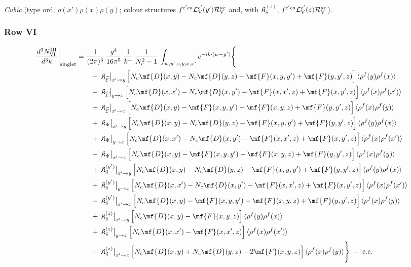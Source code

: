\emph{Cubic} (type ord, $\rho(x')\rho(x)\rho(y)$; colour structures $f^{c'ca}\mathcal{L}^{c'}_{\rm V}(y')\mathcal{R}^{ac}_{\rm V}$ and, with $\mathfrak{K}_{\delta}^{(z)}$, $f^{c'ca}\mathcal{L}^{c'}_{\rm V}(z)\mathcal{R}^{ac}_{\rm V}$).
\subsubsection*{Row VI}

\begin{align}
\frac{d^{3}N^{\rm III}_{\rm VI}}{d^{3}k}\bigg|_{\rm singlet}&=\frac{1}{(2\pi)^{3}}\,\frac{g^{4}}{16\pi^{5}}\,\frac{1}{k^{+}}\,\frac{1}{N_{c}^{2}-1}\,\int_{w,y',z,y,x,x'}e^{-ik\cdot(w-y')}\Bigg\{\notag\\
&\qquad -\,\mathfrak{K}_{\widehat{\mathcal{E}}}\big|_{x'\to y}\,\Big[N_{c}\mf{D}(x,y)-N_{c}\mf{D}(y,z)-\mf{F}(x,y,y')+\mf{F}(y,y',z)\Big]\,\langle\rho^{f}(y)\rho^{f}(x)\rangle\notag\\
&\qquad -\,\mathfrak{K}_{\widehat{\mathcal{E}}}\big|_{y\to x}\,\Big[N_{c}\mf{D}(x,x')-N_{c}\mf{D}(x,y')-\mf{F}(x,x',z)+\mf{F}(x,y',z)\Big]\,\langle\rho^{f}(x)\rho^{f}(x')\rangle\notag\\
&\qquad +\,\mathfrak{K}_{\widehat{\mathcal{E}}}\big|_{x'\to x}\,\Big[N_{c}\mf{D}(x,y)-\mf{F}(x,y,y')-\mf{F}(x,y,z)+\mf{F}(y,y',z)\Big]\,\langle\rho^{f}(x)\rho^{f}(y)\rangle\notag\\
&\qquad +\,\mathfrak{K}_{\Psi}\big|_{x'\to y}\,\Big[N_{c}\mf{D}(x,y)-N_{c}\mf{D}(y,z)-\mf{F}(x,y,y')+\mf{F}(y,y',z)\Big]\,\langle\rho^{f}(y)\rho^{f}(x)\rangle\notag\\
&\qquad +\,\mathfrak{K}_{\Psi}\big|_{y\to x}\,\Big[N_{c}\mf{D}(x,x')-N_{c}\mf{D}(x,y')-\mf{F}(x,x',z)+\mf{F}(x,y',z)\Big]\,\langle\rho^{f}(x)\rho^{f}(x')\rangle\notag\\
&\qquad -\,\mathfrak{K}_{\Psi}\big|_{x'\to x}\,\Big[N_{c}\mf{D}(x,y)-\mf{F}(x,y,y')-\mf{F}(x,y,z)+\mf{F}(y,y',z)\Big]\,\langle\rho^{f}(x)\rho^{f}(y)\rangle\notag\\
&\qquad +\,\mathfrak{K}_{\delta}^{(y')}\big|_{x'\to y}\,\Big[N_{c}\mf{D}(x,y)-N_{c}\mf{D}(y,z)-\mf{F}(x,y,y')+\mf{F}(y,y',z)\Big]\,\langle\rho^{f}(y)\rho^{f}(x)\rangle\notag\\
&\qquad +\,\mathfrak{K}_{\delta}^{(y')}\big|_{y\to x}\,\Big[N_{c}\mf{D}(x,x')-N_{c}\mf{D}(x,y')-\mf{F}(x,x',z)+\mf{F}(x,y',z)\Big]\,\langle\rho^{f}(x)\rho^{f}(x')\rangle\notag\\
&\qquad -\,\mathfrak{K}_{\delta}^{(y')}\big|_{x'\to x}\,\Big[N_{c}\mf{D}(x,y)-\mf{F}(x,y,y')-\mf{F}(x,y,z)+\mf{F}(y,y',z)\Big]\,\langle\rho^{f}(x)\rho^{f}(y)\rangle\notag\\
&\qquad +\,\mathfrak{K}_{\delta}^{(z)}\big|_{x'\to y}\,\Big[N_{c}\mf{D}(x,y)-\mf{F}(x,y,z)\Big]\,\langle\rho^{f}(y)\rho^{f}(x)\rangle\notag\\
&\qquad +\,\mathfrak{K}_{\delta}^{(z)}\big|_{y\to x}\,\Big[N_{c}\mf{D}(x,x')-\mf{F}(x,x',z)\Big]\,\langle\rho^{f}(x)\rho^{f}(x')\rangle\notag\\
&\qquad -\,\mathfrak{K}_{\delta}^{(z)}\big|_{x'\to x}\,\Big[N_{c}\mf{D}(x,y)+N_{c}\mf{D}(y,z)-2\mf{F}(x,y,z)\Big]\,\langle\rho^{f}(x)\rho^{f}(y)\rangle\Bigg\}\;+\;{\rm c.c.}\label{eq:s-III-VI}
\end{align}

